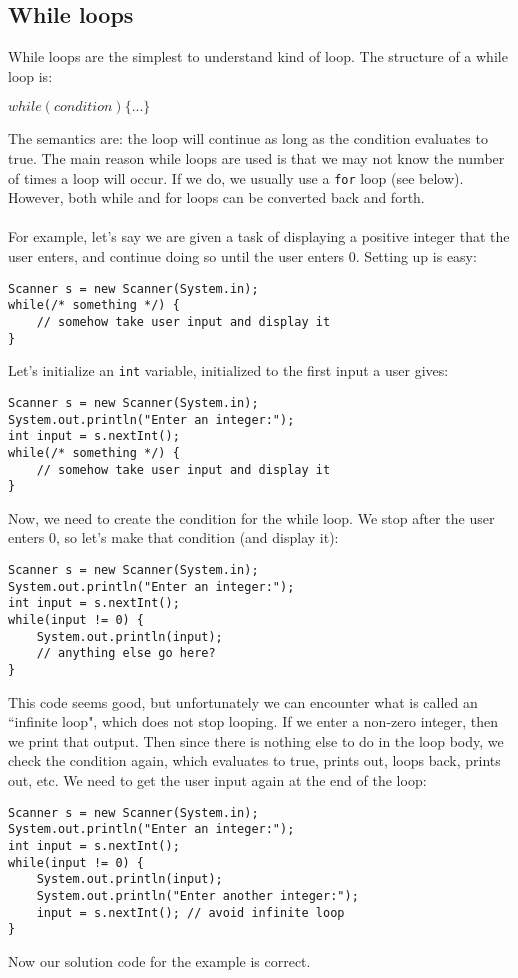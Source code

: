\subsection{While loops}
While loops are the simplest to understand kind of loop. The structure of a while loop is:
\begin{center}
$while(condition) \{...\}$
\end{center}
The semantics are: the loop will continue as long as the condition evaluates to true. The main reason while loops are used is that we may not know the number of times a loop will occur. If we do, we usually use a \verb|for| loop (see below). However, both while and for loops can be converted back and forth.
\\ \\
For example, let's say we are given a task of displaying a positive integer that the user enters, and continue doing so until the user enters 0. Setting up is easy:
\begin{lstlisting}
Scanner s = new Scanner(System.in);
while(/* something */) {
	// somehow take user input and display it
}
\end{lstlisting}
Let's initialize an \verb|int| variable, initialized to the first input a user gives:
\begin{lstlisting}
Scanner s = new Scanner(System.in);
System.out.println("Enter an integer:");
int input = s.nextInt();
while(/* something */) {
	// somehow take user input and display it
}
\end{lstlisting}
Now, we need to create the condition for the while loop. We stop after the user enters 0, so let's make that condition (and display it):
\begin{lstlisting}
Scanner s = new Scanner(System.in);
System.out.println("Enter an integer:");
int input = s.nextInt();
while(input != 0) {
	System.out.println(input);
	// anything else go here?
}
\end{lstlisting}
This code seems good, but unfortunately we can encounter what is called an ``infinite loop", which does not stop looping. If we enter a non-zero integer, then we print that output. Then since there is nothing else to do in the loop body, we check the condition again, which evaluates to true, prints out, loops back, prints out, etc. We need to get the user input again at the end of the loop:
\begin{lstlisting}
Scanner s = new Scanner(System.in);
System.out.println("Enter an integer:");
int input = s.nextInt();
while(input != 0) {
	System.out.println(input);
	System.out.println("Enter another integer:");
	input = s.nextInt(); // avoid infinite loop
}
\end{lstlisting}
Now our solution code for the example is correct.

